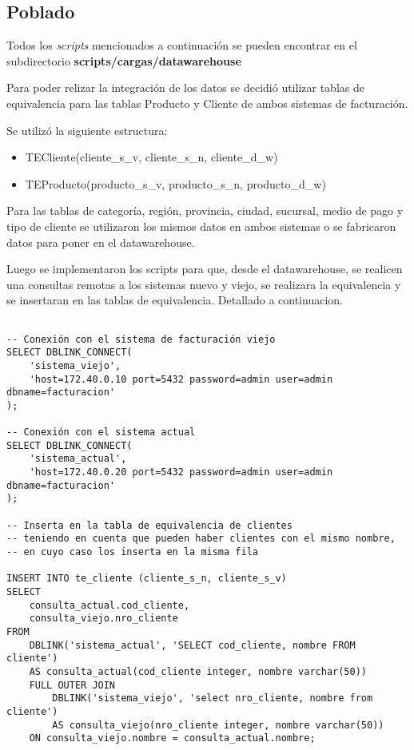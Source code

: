\subsection{Poblado}

Todos los \emph{scripts} mencionados a continuación se pueden encontrar en el subdirectorio \textbf{scripts/cargas/datawarehouse}

Para poder relizar la integración de los datos se decidió utilizar tablas de equivalencia para las tablas Producto y Cliente de ambos sistemas de facturación.

Se utilizó la siguiente estructura:

\begin{itemize}
    \item TECliente(cliente\_s\_v, cliente\_s\_n, cliente\_d\_w)
    \item TEProducto(producto\_s\_v, producto\_s\_n, producto\_d\_w)
\end{itemize}

Para las tablas de categoría, región, provincia, ciudad, sucursal, medio de pago y tipo de cliente se utilizaron los mismos datos en ambos sistemas o se fabricaron datos para poner en el datawarehouse.

Luego se implementaron los scripts para que, desde el datawarehouse, se realicen una consultas remotas a los sistemas nuevo y viejo, se realizara la equivalencia y se insertaran en las tablas de equivalencia. Detallado a continuacion. 

\begin{lstlisting}[title=Inserción a la tabla de equivalencia de cliente]

-- Conexión con el sistema de facturación viejo
SELECT DBLINK_CONNECT(
	'sistema_viejo',
	'host=172.40.0.10 port=5432 password=admin user=admin dbname=facturacion'
);

-- Conexión con el sistema actual
SELECT DBLINK_CONNECT(
	'sistema_actual',
	'host=172.40.0.20 port=5432 password=admin user=admin dbname=facturacion'
);

-- Inserta en la tabla de equivalencia de clientes
-- teniendo en cuenta que pueden haber clientes con el mismo nombre,
-- en cuyo caso los inserta en la misma fila

INSERT INTO te_cliente (cliente_s_n, cliente_s_v)
SELECT
    consulta_actual.cod_cliente,
    consulta_viejo.nro_cliente
FROM
    DBLINK('sistema_actual', 'SELECT cod_cliente, nombre FROM cliente')
    AS consulta_actual(cod_cliente integer, nombre varchar(50))
    FULL OUTER JOIN
        DBLINK('sistema_viejo', 'select nro_cliente, nombre from cliente')
        AS consulta_viejo(nro_cliente integer, nombre varchar(50))
    ON consulta_viejo.nombre = consulta_actual.nombre;
    
\end{lstlisting}

